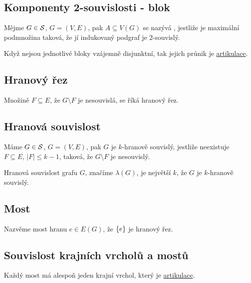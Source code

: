 \subsection{Komponenty 2-souvislosti - blok}
Mějme $G \in \S$, $G = (V,E)$, pak $A \subseteq V(G)$ se nazývá , jestliže je maximální podmnožina taková, že 
jí indukovaný podgraf je 2-souvislý. \\
\begin{figure}[H]
    \centering
\end{figure}
Když nejsou jednotlivé bloky vzájemně disjunktní, tak jejich průnik je \hyperref[artikulace]{artikulace}.

\subsection{Hranový řez}
Množině $F \subseteq E$, že $G \setminus F$ je nesouvislá, se říká hranový řez.

\subsection{Hranová souvislost}
Máme $G \in \S$, $G = (V,E)$, pak $G$ je $k$-hranově souvislý, jestliže neexistuje $F \subseteq E$, $|F| \leq k-1$, 
taková, že $G \setminus F$ je nesouvislý.

Hranová souvislost grafu $G$, značíme $\lambda(G)$, je největší $k$, že $G$ je $k$-hranově souvislý.\\


\subsection{Most}
Nazvěme most hranu $e\in E(G)$, že $\bc{e}$ je hranový řez.

\subsection{Souvislost krajních vrcholů a mostů} %
Každý most má alespoň jeden krajní vrchol, který je \hyperref[artikulace]{artikulace}.

